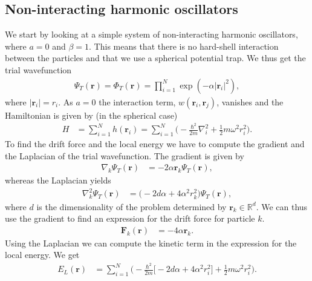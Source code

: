 \documentclass[
    a4paper, aps, twocolumn, floatfix, superscriptaddress,
    nofootinbib]{revtex4-1}
\newcommand{\vf}{\mathbf}
\newcommand{\1}{\mathds{1}}
\newcommand{\para}[1]{\left(#1\right)}
\newcommand{\half}{\frac{1}{2}}
\begin{document}
    \subsection{Non-interacting harmonic oscillators}
        We start by looking at a simple system of non-interacting harmonic
        oscillators, where $a = 0$ and $\beta = 1$. This means that there is no
        hard-shell interaction between the particles and that we use a spherical
        potential trap.  We thus get the trial  wavefunction
        \begin{align}
            \Psi_T(\vf{r})
            = \Phi_T(\vf{r})
            = \prod_{i = 1}^N \exp\para{
                -\alpha |\vf{r}_i|^2
            },
        \end{align}
        where $|\vf{r}_i| = r_i$. As $a = 0$ the interaction term,
        $w(\vf{r}_i, \vf{r}_j)$, vanishes and the Hamiltonian is given by
        (in the spherical case)
        \begin{align}
            H &= \sum_{i = 1}^N h(\vf{r}_i)
            = \sum_{i = 1}^N \Biggl(
                -\frac{\hbar^2}{2m}\nabla_i^2
                + \half m \omega^2 r_i^2
            \Biggr).
        \end{align}
        To find the drift force and the local energy we have to compute the
        gradient and the Laplacian of the trial wavefunction. The gradient is
        given by
        \begin{align}
            \nabla_k\Psi_T(\vf{r})
            &= -2\alpha \vf{r}_k\Psi_T(\vf{r}),
        \end{align}
        whereas the Laplacian yields
        \begin{align}
            \nabla^2_k\Psi_T(\vf{r})
            &= \big(-2d\alpha + 4\alpha^2 r_k^2\bigr)\Psi_T(\vf{r}),
        \end{align}
        where $d$ is the dimensionality of the problem determined by $\vf{r}_k
        \in \mathbb{R}^d$. We can thus use the gradient to find an expression
        for the drift force for particle $k$.
        \begin{align}
            \vf{F}_k(\vf{r})
            &= -4\alpha\vf{r}_k.
        \end{align}
        Using the Laplacian we can compute the kinetic term in the expression
        for the local energy. We get
        \begin{align}
            E_L(\vf{r})
            &=
            \sum_{i = 1}^N
            \Biggl(
                -\frac{\hbar^2}{2m}
                \bigl[
                    -2d\alpha + 4\alpha^2 r_i^2
                \bigr]
                + \half m\omega^2 r_i^2
            \Biggr).
        \end{align}
\end{document}
